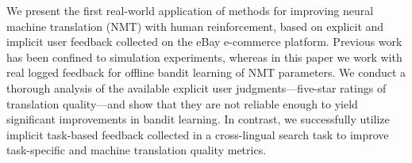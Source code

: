 We present the first real-world application of methods for improving neural machine translation (NMT) with human reinforcement, based on explicit and implicit user feedback collected on the eBay e-commerce platform. Previous work has been confined to simulation experiments, whereas in this paper we work with real logged feedback for offline bandit learning of NMT parameters. We conduct a thorough analysis of the available explicit user judgments---five-star ratings of translation quality---and show that they are not reliable enough to yield significant improvements in bandit learning. In contrast, we successfully utilize implicit task-based feedback collected in a cross-lingual search task to improve task-specific and machine translation quality metrics.
